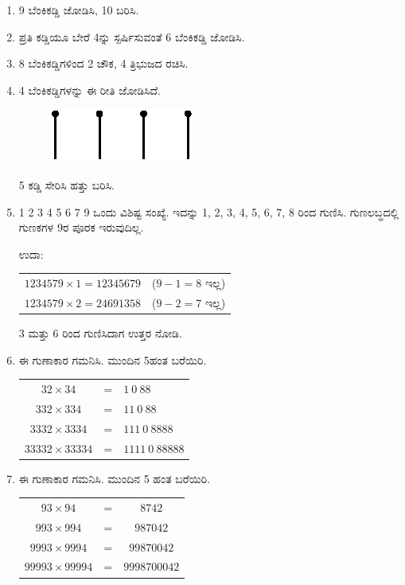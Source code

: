 \begin{enumerate}
\item 9 ಬೆಂಕಿಕಡ್ಡಿ ಜೋಡಿಸಿ, 10 ಬರಿಸಿ. 

\item ಪ್ರತಿ ಕಡ್ಡಿಯೂ ಬೇರೆ 4ನ್ನು ಸ್ಪರ್ಷಿಸುವಂತೆ 6 ಬೆಂಕಿಕಡ್ಡಿ ಜೋಡಿಸಿ. 

\item 8 ಬೆಂಕಿಕಡ್ಡಿಗಳಿಂದ 2 ಚೌಕ, 4 ತ್ರಿಭುಜದ ರಚಿಸಿ.

\item 4 ಬೆಂಕಿಕಡ್ಡಿಗಳನ್ನು ಈ ರೀತಿ ಜೋಡಿಸಿದೆ. 
\begin{figure}[H]
\centering
\includegraphics{images/chap12/q12.eps}
\end{figure}


5 ಕಡ್ಡಿ ಸೇರಿಸಿ ಹತ್ತು ಬರಿಸಿ. 

\item 1 2 3 4 5 6 7 9 ಒಂದು ವಿಶಿಷ್ಟ ಸಂಖ್ಯೆ. ಇದನ್ನು 1, 2, 3, 4, 5, 6, 7, 8 ರಿಂದ ಗುಣಿಸಿ. ಗುಣಲಬ್ಧದಲ್ಲಿ ಗುಣಕಗಳ 9ರ ಪೂರಕ ಇರುವುದಿಲ್ಲ. 

ಉದಾ: 
\begin{tabular}[t]{ll}
$1234579\times 1 = 12345679$ & ($9 - 1 = 8$ ಇಲ್ಲ)\\
$1234579\times 2 = 24691358$ & ($9 - 2 = 7$ ಇಲ್ಲ)
\end{tabular}

3 ಮತ್ತು 6 ರಿಂದ ಗುಣಿಸಿದಾಗ ಉತ್ತರ ನೋಡಿ. 

\item ಈ ಗುಣಾಕಾರ ಗಮನಿಸಿ. ಮುಂದಿನ 5ಹಂತ ಬರೆಯಿರಿ. 

\begin{tabular}[t]{ccl}
$32\times 34$ & = & $1~0~88$\\
$332\times 334$ & = & $11~0~88$\\
$3332\times 3334$ & = & $111~0~8888$\\
$33332\times 33334$ & = & $1111~0~88888$\\
\end{tabular}

\item ಈ ಗುಣಾಕಾರ ಗಮನಿಸಿ. ಮುಂದಿನ 5 ಹಂತ ಬರೆಯಿರಿ. 

\begin{tabular}[t]{ccc}
$93\times 94$ & = & $8742$\\
$993\times 994$ & = & $987042$\\
$9993\times 9994$ & = & $99870042$\\
$99993\times 99994$ & = & $9998700042$
\end{tabular}


\end{enumerate}
